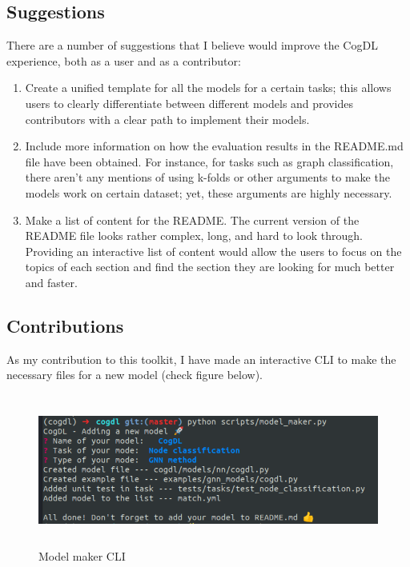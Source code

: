 \documentclass[12pt,a4paper]{article}
\begin{document}
	\subsection{Suggestions}
	\noindent There are a number of suggestions that I believe would improve the CogDL experience, both as a user and as a contributor:
	\begin{enumerate}
		\item Create a unified template for all the models for a certain tasks; this allows users to clearly differentiate between different models and provides contributors with a clear path to implement their models. 
		\item Include more information on how the evaluation results in the README.md file have been obtained. For instance, for tasks such as graph classification, there aren't any mentions of using k-folds or other arguments to make the models work on certain dataset; yet, these arguments are highly necessary.
		\item Make a list of content for the README. The current version of the README file looks rather complex, long, and hard to look through. Providing an interactive list of content would allow the users to focus on the topics of each section and find the section they are looking for much better and faster.
	\end{enumerate}
	
	\vspace{-0.5cm}
	\subsection{Contributions}
	
	\noindent As my contribution to this toolkit, I have made an interactive CLI to make the necessary files for a new model (check figure below).
	
	\begin{figure}[H]
		\centering
		\includegraphics[width=15cm, height=5cm]{Figures/model}
		\vspace{-0.7cm}
		\caption{Model maker CLI}
	\end{figure}
\end{document}
